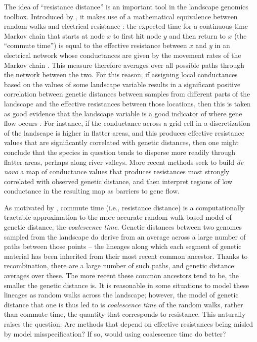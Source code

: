 \documentclass{article}
\begin{document}
The idea of ``resistance distance'' is an important tool in the landscape genomics toolbox.
Introduced by \citet{mcrae2006isolation},
it makes use of a mathematical equivalence between random walks and electrical resistance
\citep{nashwilliams1959random}:
the expected time for a continuous-time Markov chain that starts at node $x$
to first hit node $y$ and then return to $x$ (the ``commute time'')
is equal to the effective resistance between $x$ and $y$ in an electrical network
whose conductances are given by the movement rates of the Markov chain \citep{levin2008markov,doyle2006random}.
This measure therefore averages over all possible paths through the network between the two.
For this reason, 
if assigning local conductances based on the values of some landscape variable
results in a significant positive correlation between 
genetic distances between samples from different parts of the landscape
and the effective resistances between those locations,
then this is taken as good evidence that the landscape variable is a good indicator of
where gene flow occurs \citep{mcrae2007circuit,cushman2006complex}.
For instance,
if the conductance across a grid cell in a discretization of the landscape
is higher in flatter areas,
and this produces effective resistance values 
that are significantly correlated with genetic distances,
then one might conclude that the species in question tends to disperse more readily through flatter areas,
perhaps along river valleys.
More recent methods \citep{petkova2016visualizing,hanks2013circuit} seek to build \emph{de novo} 
a map of conductance values that produces resistances 
most strongly correlated with observed genetic distance,
and then interpret regions of low conductance in the resulting map as barriers to gene flow.

As motivated by \citet{mcrae2006isolation},
commute time (i.e., resistance distance) is a computationally tractable approximation
to the more accurate random walk-based model of genetic distance,
the \emph{coalescence time}.
Genetic distances between two genomes sampled from the landscape
do derive from an average across a large number of paths between those points --
the lineages along which each segment of genetic material has been inherited
from their most recent common ancestor.
Thanks to recombination, there are a large number of such paths, 
and genetic distance averages over these.
The more recent these common ancestors tend to be,
the smaller the genetic distance is.
It is reasonable in some situations to model these lineages as random walks across the landscape;
however, the model of genetic distance that one is thus led to
is \emph{coalescence time} of the random walks, 
rather than commute time, the quantity that corresponds to resistance.
This naturally raises the question: 
Are methods that depend on effective resistances being misled by model misspecification?
If so, would using coalescence time do better?
\end{document}
